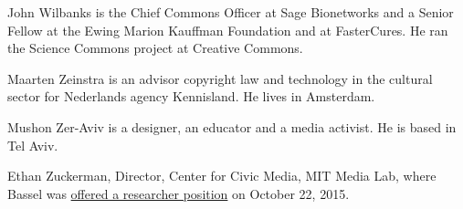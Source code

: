 \protect\hypertarget{john-wilbanks}{}{}John Wilbanks is the Chief
Commons Officer at Sage Bionetworks and a Senior Fellow at the Ewing
Marion Kauffman Foundation and at FasterCures. He ran the Science
Commons project at Creative Commons.

\protect\hypertarget{maarten-zeinstra}{}{}Maarten Zeinstra is an advisor
copyright law and technology in the cultural sector for Nederlands
agency Kennisland. He lives in Amsterdam.

\protect\hypertarget{mushon-zer-aviv}{}{}Mushon Zer-Aviv is a designer,
an educator and a media activist. He is based in Tel Aviv.

\protect\hypertarget{ethan-zuckerman}{}{}Ethan Zuckerman, Director,
Center for Civic Media, MIT Media Lab, where Bassel was
\href{http://joi.ito.com/weblog/2015/10/22/mit-media-lab-r.html}{offered
a researcher position} on October 22, 2015.
